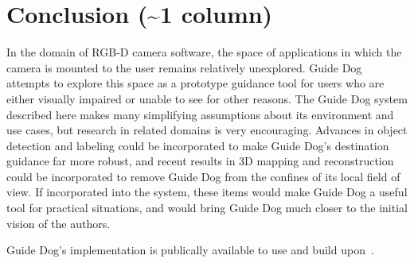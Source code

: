 \section{Conclusion (\textasciitilde 1 column)}
\label{sec:conclusion}

In the domain of RGB-D camera software, the space of applications in which the
camera is mounted to the user remains relatively unexplored. Guide Dog attempts
to explore this space as a prototype guidance tool for users who are either
visually impaired or unable to see for other reasons. The Guide Dog system
described here makes many simplifying assumptions about its environment and
use cases, but research in related domains is very encouraging. Advances in
object detection and labeling could be incorporated to make Guide Dog's
destination guidance far more robust, and recent results in 3D mapping and
reconstruction could be incorporated to remove Guide Dog from the confines
of its local field of view. If incorporated into the system, these items
would make Guide Dog a useful tool for practical situations, and would bring
Guide Dog much closer to the initial vision of the authors. 

Guide Dog's implementation is publically available to use and build
upon~\cite{guidedog-website}.
